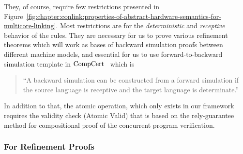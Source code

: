They, of course, require few restrictions presented in Figure~\ref{fig:chapter:conlink:properties-of-abstract-hardware-semantics-for-multicore-linking}. 
Most restrictions are for the \textit{deterministic} and \textit{receptive} behavior of the rules.
They are necessary for us to prove various refinement theorems which will work as bases of backward simulation proofs between different machine models, 
and essential for us to use forward-to-backward simulation template in $\mathrm{CompCert}$~\cite{leroy06} which is
\begin{quote}
``A backward simulation can be constructed from a forward
simulation if the source language is receptive and the target
language is determinate.''
\end{quote}
In addition to that, the atomic operation, which only exists 
in our framework 
requires the validity check (\textsf{Atomic Valid})
that is based on the rely-guarantee method for compositional proof of the concurrent program verification.

\subsubsection{For Refinement Proofs}


